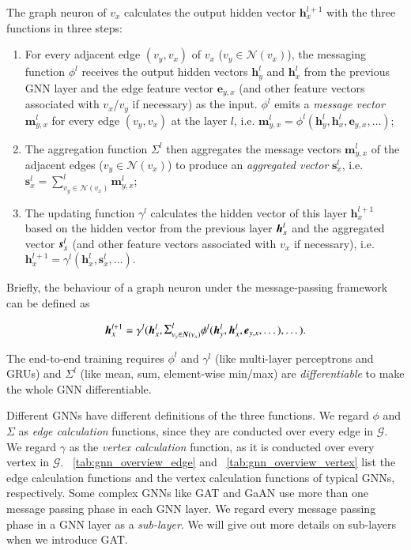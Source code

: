 The graph neuron of $v_x$ calculates the output hidden vector $\boldsymbol{h}^{l+1}_x$ with the three functions in three steps:
%
\begin{enumerate}
    \item  For every adjacent edge $(v_y, v_x)$ of $v_x$ ($v_y \in \mathcal{N}(v_x)$), the messaging function $\phi^l$ receives the output hidden vectors $\boldsymbol{h}^l_y$ and $\boldsymbol{h}^l_x$ from the previous GNN layer and the edge feature vector $\boldsymbol{e}_{y,x}$ (and other feature vectors associated with $v_x$/$v_y$ if necessary) as the input.
    $\phi^l$ emits a \emph{message vector} $\boldsymbol{m}^l_{y,x}$ for every edge $(v_y, v_x)$ at the layer $l$, i.e. $\boldsymbol{m}^l_{y,x} = \phi^l(\boldsymbol{h}^l_y, \boldsymbol{h}^l_x, \boldsymbol{e}_{y,x}, \dots)$;
    \item The aggregation function $\Sigma^l$ then aggregates the message vectors $\boldsymbol{m}^l_{y,x}$ of the adjacent edges ($v_y \in \mathcal{N}(v_x)$) to produce an \emph{aggregated vector} $\boldsymbol{s}^l_x$, i.e. $\boldsymbol{s}^l_{x} = \sum^l_{v_y \in \mathcal{N}(v_x)}{\boldsymbol{m}^l_{y,x}}$;
    \item The updating function $\gamma^l$ calculates the {hidden vector} of this layer $\boldsymbol{h}^{l+1}_x$ based on the hidden vector from the previous layer $\boldsymbol{h}^l_x$ and the aggregated vector $\boldsymbol{s}^l_x$ (and other feature vectors associated with $v_x$ if necessary), i.e. $\boldsymbol{h}^{l+1}_x = \gamma^l(\boldsymbol{h}^l_x, \boldsymbol{s}^l_x, \dots)$.
\end{enumerate}

Briefly, the behaviour of a graph neuron under the message-passing framework can be defined as  

\begin{equation}
      \MyVec{h}^{l+1}_x = \gamma^l(\MyVec{h}^l_x, \mathlarger{\Sigma}^l_{v_y \in \MyVec{N}(v_x)}{\phi^l(\MyVec{h}^l_y, \MyVec{h}^l_x,   \MyVec{e}_{y,x}, \dots)}, \dots).
\end{equation}

The end-to-end training requires $\phi^l$ and $\gamma^l$ (like multi-layer perceptrons and GRUs) and $\Sigma^l$ (like mean, sum, element-wise min/max) are \emph{differentiable} to make the whole GNN differentiable.

Different GNNs have different definitions of the three functions.
%
We regard $\phi$ and $\Sigma$ as \emph{edge calculation} functions, since they are conducted over every edge in $\mathcal{G}$.
%
We regard $\gamma$ as the \emph{vertex calculation} function, as it is conducted over every vertex in $\mathcal{G}$.
%
\tablename~\ref{tab:gnn_overview_edge} and \tablename~\ref{tab:gnn_overview_vertex} list the edge calculation functions and the vertex calculation functions of typical GNNs, respectively.
%
Some complex GNNs like GAT \cite{huang2018_gat} and GaAN  \cite{zhang2018_gaan} use more than one message passing phase in each GNN layer.
%
We regard every message passing phase in a GNN layer as a \emph{sub-layer}.
%
We will give out more details on sub-layers when we introduce GAT.

